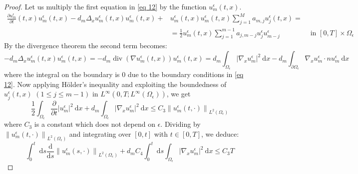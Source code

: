 \begin{proof}
 Let us multiply the first equation in \eqref{eq 12} by the function $u_{m}^{\epsilon}(t, x)$.
 \begin{equation*}
 \begin{aligned}
 \frac{\partial u_{m}^{\epsilon}}{\partial t}(t, x)u_{m}^{\epsilon}(t, x)-d_{m} \Delta_{x} u_{m}^{\epsilon}(t, x)u_{m}^{\epsilon}(t, x)+&u_{m}^{\epsilon}(t, x)u_{m}^{\epsilon}(t, x) \sum_{j=1}^{M} a_{m, j} u_{j}^{\epsilon}(t, x)=\\ &=\frac{1}{2} u_{m}^{\epsilon}(t, x)\sum_{j=1}^{m-1} a_{j, m-j} u_{j}^{\epsilon} u_{m-j}^{\epsilon} & \text { in }[0, T] \times \Omega_{\epsilon} 
     \end{aligned}
 \end{equation*}
By the divergence theorem the second term becomes:
 \begin{equation*}
     -d_{m} \Delta_{x} u_{m}^{\epsilon}(t, x)u_{m}^{\epsilon}(t, x)= -d_m\operatorname{div} (\nabla u_{m}^{\epsilon}(t, x) )u_{m}^{\epsilon}(t, x)=d_m \int_{\Omega_\epsilon} \left|\nabla_{x} u_{m}^{\epsilon}\right|^{2} \mathrm{~d} x - d_m\int_{\partial \Omega_\epsilon} \nabla_{x} u_{m}^{\epsilon} \cdot n u_{m}^{\epsilon} \mathrm{~d} x
 \end{equation*}
 where the integral on the boundary is $0$ due to the boundary conditions in \eqref{eq 12}.
Now applying Hölder's inequality and exploiting the boundedness of $u_{j}^{\epsilon}(t, x)$ $(1 \leq j \leq m-1)$ in $L^{\infty}\left(0, T ; L^{\infty}\left(\Omega_{\epsilon}\right)\right)$, we get
\begin{equation}
  \frac{1}{2} \int_{\Omega_{\epsilon}} \frac{\partial}{\partial t}\left|u_{m}^{\epsilon}\right|^{2} \mathrm{~d} x+d_{m} \int_{\Omega_{\epsilon}}\left|\nabla_{x} u_{m}^{\epsilon}\right|^{2} \mathrm{~d} x \leq C_{3}\left\|u_{m}^{\epsilon}(t, \cdot)\right\|_{L^{2}\left(\Omega_{\epsilon}\right)}
\label{eq 64}\end{equation}
where $C_{3}$ is a constant which does not depend on $\epsilon$. Dividing by $\left\|u_{m}^{\epsilon}(t, \cdot)\right\|_{L^{2}\left(\Omega_{\epsilon}\right)}$ and integrating over $[0, t]$ with $t \in[0, T]$, we deduce:
\begin{equation}
  \int_{0}^{t} \mathrm{~d} s \frac{\mathrm{d}}{\mathrm{d} s}\left\|u_{m}^{\epsilon}(s, \cdot)\right\|_{L^{2}\left(\Omega_{\epsilon}\right)}+d_{m} C_{4} \int_{0}^{t} \mathrm{~d} s \int_{\Omega_{\epsilon}}\left|\nabla_{x} u_{m}^{\epsilon}\right|^{2} \mathrm{~d} x \leq C_{3} T
\label{eq 65}\end{equation}

\end{proof}

